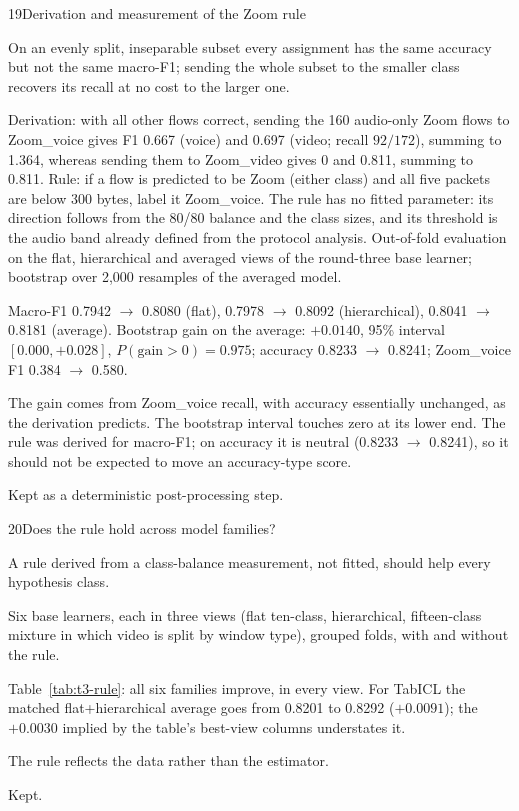\begin{explog}{19}{Derivation and measurement of the Zoom rule}
\item[Hypothesis] On an evenly split, inseparable subset every assignment has the same accuracy
but not the same macro-F1; sending the whole subset to the smaller class recovers its
recall at no cost to the larger one.
\item[Method] Derivation: with all other flows correct, sending the 160 audio-only Zoom
flows to Zoom\_voice gives F1 0.667 (voice) and 0.697 (video; recall $92/172$),
summing to 1.364, whereas sending them to Zoom\_video gives 0 and 0.811, summing to
0.811. Rule: if a flow is predicted to be Zoom (either class) and all five packets
are below 300 bytes, label it Zoom\_voice. The rule has no fitted parameter: its
direction follows from the 80/80 balance and the class sizes, and its threshold is
the audio band already defined from the protocol analysis. Out-of-fold evaluation on
the flat, hierarchical and averaged views of the round-three base learner;
bootstrap over 2{,}000 resamples of the averaged model.
\item[Result] Macro-F1 0.7942 $\rightarrow$ 0.8080 (flat), 0.7978 $\rightarrow$ 0.8092
(hierarchical), 0.8041 $\rightarrow$ 0.8181 (average). Bootstrap gain on the
average: $+0.0140$, 95\% interval $[0.000,+0.028]$, $P(\mathrm{gain}>0)=0.975$;
accuracy 0.8233 $\rightarrow$ 0.8241; Zoom\_voice F1 0.384 $\rightarrow$ 0.580.
\item[Inference] The gain comes from Zoom\_voice recall, with accuracy essentially unchanged, as
the derivation predicts. The bootstrap interval touches zero at its lower end. The
rule was derived for macro-F1; on accuracy it is neutral (0.8233 $\rightarrow$
0.8241), so it should not be expected to move an accuracy-type score.
\item[Verdict] Kept as a deterministic post-processing step.
\end{explog}

\begin{explog}{20}{Does the rule hold across model families?}
\item[Hypothesis] A rule derived from a class-balance measurement, not fitted, should help every
hypothesis class.
\item[Method] Six base learners, each in three views (flat ten-class, hierarchical,
fifteen-class mixture in which video is split by window type), grouped folds, with
and without the rule.
\item[Result] Table~\ref{tab:t3-rule}: all six families improve, in every view. For TabICL the matched flat+hierarchical average goes from 0.8201 to 0.8292 ($+0.0091$); the $+0.0030$ implied by the table's best-view columns understates it. %
\item[Inference] The rule reflects the data rather than the estimator.
\item[Verdict] Kept.
\end{explog}

